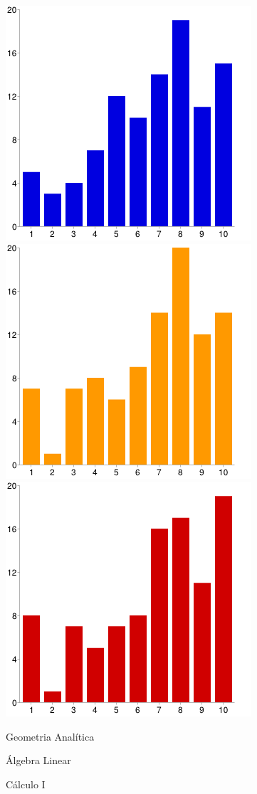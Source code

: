\documentclass[12pt,a4paper]{article}
\begin{document}
\begin{figure}[!h]

\center
\includegraphics[scale=0.36]{imagens/fig7.png}
\includegraphics[scale=0.36]{imagens/fig8.png} 
\includegraphics[scale=0.36]{imagens/fig9.png} 
\caption{Geometria Analítica}
\caption{Álgebra Linear}
\caption{Cálculo I}

\end{figure}
\end{document}
